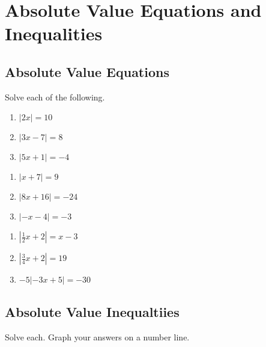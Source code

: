 \chapter{Absolute Value Equations and Inequalities}

\section{Absolute Value Equations}

Solve each of the following.

\begin{multicols}{3}
\begin{enumerate}
	\item $|2x| = 10$
	\item $|3x-7|=8$
	\item $|5x+1| = -4$
\end{enumerate}	\setcounter{Review}{\value{enumi}}
\end{multicols}
\begin{multicols}{3}
\begin{enumerate}	\setcounter{enumi}{\value{Review}}
	\item $|x + 7| = 9$
	\item $|8x+16| = -24$
	\item $|-x-4| = -3$
\end{enumerate}	\setcounter{Review}{\value{enumi}}
\end{multicols}
\begin{multicols}{3}
\begin{enumerate}	\setcounter{enumi}{\value{Review}}
	\item $\left|\frac{1}{2}x + 2\right| = x - 3$
	\item $\left| \frac{3}{4}x + 2 \right| = 19$
	\item $-5|-3x+5| = -30$
\end{enumerate}	\setcounter{Review}{\value{enumi}}
\end{multicols}



\section{Absolute Value Inequaltiies}

Solve each. Graph your answers on a number line.

